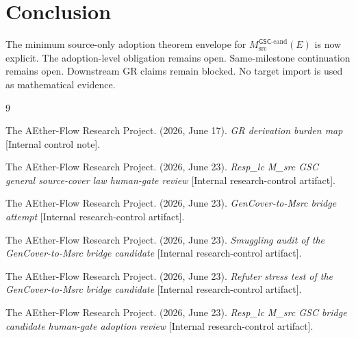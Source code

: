 \documentclass[11pt]{article}
\newcommand{\GSC}{\mathsf{GSC}}
\newcommand{\Mgsccand}{M_{\mathrm{src}}^{\GSC\mbox{-}\mathrm{cand}}}
\begin{document}
\section{Conclusion}

The minimum source-only adoption theorem envelope for \(\Mgsccand(E)\) is now
explicit. The adoption-level obligation remains open. Same-milestone
continuation remains open. Downstream GR claims remain blocked. No target
import is used as mathematical evidence.

\begin{thebibliography}{9}

The AEther-Flow Research Project. (2026, June 17). \emph{GR derivation burden
map} [Internal control note].

The AEther-Flow Research Project. (2026, June 23). \emph{Resp\_lc M\_src GSC
general source-cover law human-gate review} [Internal research-control
artifact].

The AEther-Flow Research Project. (2026, June 23). \emph{GenCover-to-Msrc
bridge attempt} [Internal research-control artifact].

The AEther-Flow Research Project. (2026, June 23). \emph{Smuggling audit of
the GenCover-to-Msrc bridge candidate} [Internal research-control artifact].

The AEther-Flow Research Project. (2026, June 23). \emph{Refuter stress test
of the GenCover-to-Msrc bridge candidate} [Internal research-control
artifact].

The AEther-Flow Research Project. (2026, June 23). \emph{Resp\_lc M\_src GSC
bridge candidate human-gate adoption review} [Internal research-control
artifact].

\end{thebibliography}
\end{document}
